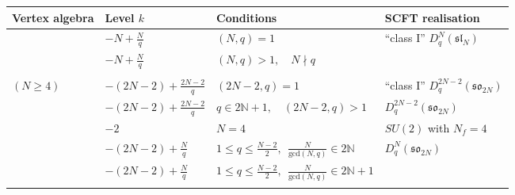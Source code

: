 \begin{table}[]
\centering
\footnotesize

\renewcommand{\arraystretch}{1.60}
\setlength{\tabcolsep}{4pt}

\setlength{\arrayrulewidth}{0.6pt}

\begin{tabularx}{\textwidth}{
|>{\centering\arraybackslash}p{}
|>{\raggedright\arraybackslash}p{}
|>{\raggedright\arraybackslash}p{}
|X|
}
\hline

\textbf{Vertex algebra} & \centering \textbf{Level $k$} & \centering \textbf{Conditions} & \textbf{SCFT realisation} \\
\hline

\multirow{2}{*}{$V_k(\mathfrak{sl}_N)$} & \cellcolor{knownSCFT}$-N+\frac{N}{q}$ & \cellcolor{knownSCFT}$(N,q)=1$ & \cellcolor{knownSCFT}``class I'' $D_q^N(\mathfrak{sl}_N)$ \\
\hhline{~---}

& $-N+\frac{N}{q}$ & $(N,q)>1,\quad N\nmid q$ & \\
\hline

\multirow{8}{*}{\shortstack{$V_k(\mathfrak{so}_{2N})$ \\ $(N\geqslant4)$
}} & \cellcolor{knownSCFT}$-(2N-2)+\frac{2N-2}{q}$ & \cellcolor{knownSCFT}$(2N-2,q)=1$ & \cellcolor{knownSCFT}``class I'' $D_q^{2N-2}(\mathfrak{so}_{2N})$ \\
\hhline{~---}

& \cellcolor{newSCFT} $-(2N-2)+\frac{2N-2}{q}$ & \cellcolor{newSCFT} $q\in2\mathbb N+1,\quad(2N-2,q)>1$ & \cellcolor{newSCFT} \qquad $D_q^{2N-2}(\mathfrak{so}_{2N})$ \\
\hhline{~---}

& \cellcolor{knownSCFT}$-2$ & \cellcolor{knownSCFT}$N=4$ & \cellcolor{knownSCFT}$SU(2)$ with $N_f=4$ \\
\hhline{~---}

& \cellcolor{newSCFT} $-(2N-2)+\frac{N}{q}$ & \cellcolor{newSCFT} $1\leqslant q\leqslant \frac{N-2}{2}, \ \ \frac{N}{\text{gcd}(N,q)} \in 2\mathbb{N}$ & \cellcolor{newSCFT} \qquad $D_q^{N}(\mathfrak{so}_{2N})$ \\
\hhline{~---}

& $-(2N-2)+\frac{N}{q}$ & $1\leqslant q\leqslant \frac{N-2}{2}, \ \ \frac{N}{\text{gcd}(N,q)} \in 2\mathbb{N}+1$ &  \\
\hhline{~---}


\end{tabularx}
\end{table}
